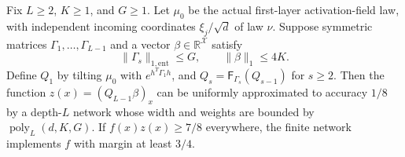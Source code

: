 \begin{proposition}\label{prop:tilt-compress}
Fix $L\geq2$, $K\geq1$, and $G\geq1$. Let $\mu_0$ be the actual
first-layer activation-field law, with independent incoming coordinates
$\xi_j/\sqrt d$ of law $\nu$. Suppose symmetric matrices $\Gamma_1,\ldots,\Gamma_{L-1}$ and a vector
$\beta\in\mathbb R^{\mathcal X}$ satisfy
\[
 \|\Gamma_s\|_{1,\mathrm{ent}}\leq G,\qquad
 \|\beta\|_1\leq4K.
\]
Define $Q_1$ by tilting $\mu_0$ with $e^{h^T\Gamma_1h}$,
and $Q_s=\mathsf F_{\Gamma_s}(Q_{s-1})$ for $s\geq2$.
Then the function $z(x)=(Q_{L-1}\beta)_x$ can be uniformly approximated to
accuracy $1/8$ by a depth-$L$ network whose width and weights are bounded by
$\operatorname{poly}_L(d,K,G)$.
If $f(x)z(x)\geq7/8$ everywhere, the finite network implements $f$ with margin at least $3/4$.
\end{proposition}
